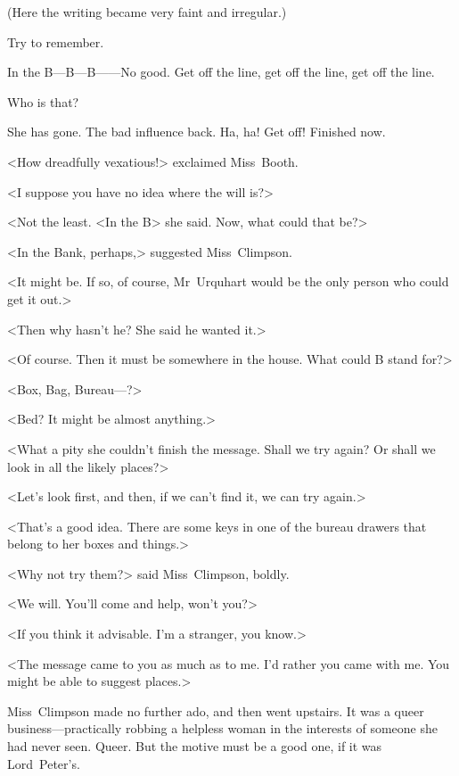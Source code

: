 \begin{dialogue}
(Here the writing became very faint and irregular.)

 Try to remember.

 In the B—B—B——No good.  Get off the line, get off the line, get off the line.

 Who is that?

  She has gone. The bad influence back. Ha, ha! Get off! Finished now. 

\end{dialogue}

<How dreadfully vexatious!> exclaimed Miss~Booth.

<I suppose you have no idea where the will is?>

<Not the least. <In the B\longdash> she said. Now, what could that be?>

<In the Bank, perhaps,> suggested Miss~Climpson.

<It might be. If so, of course, Mr~Urquhart would be the only person who could get it out.>

<Then why hasn't he? She said he wanted it.>

<Of course. Then it must be somewhere in the house. What could B stand for?>

<Box, Bag, Bureau—?>

<Bed? It might be almost anything.>

<What a pity she couldn't finish the message. Shall we try again? Or shall we look in all the likely places?>

<Let's look first, and then, if we can't find it, we can try again.>

<That's a good idea. There are some keys in one of the bureau drawers that belong to her boxes and things.>

<Why not try them?> said Miss~Climpson, boldly.

<We will. You'll come and help, won't you?>

<If you think it advisable. I'm a stranger, you know.>

<The message came to you as much as to me. I'd rather you came with me. You might be able to suggest places.>

Miss~Climpson made no further ado, and then went upstairs. It was a queer business—practically robbing a helpless woman in the interests of someone she had never seen. Queer. But the motive must be a good one, if it was Lord~Peter's.

